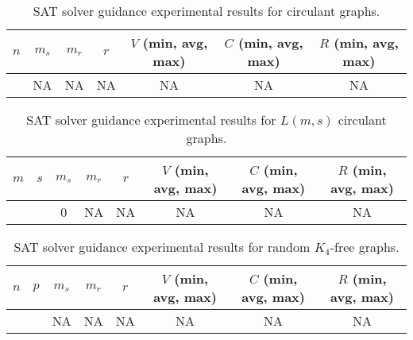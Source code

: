 \documentclass[paper=a4, fontsize=11pt]{scrartcl} %
\begin{document}
\begin{table*}[t]
	\caption{SAT solver guidance experimental results for circulant graphs.}
	\begin{tabular}{c | c | c | c | c | c | c}
		\hline
		$n$ & $m_s$ & $m_r$ & $r$ & $V$ (min, avg, max) & $C$ (min, avg, max) & $R$ (min, avg, max) \\ \hline
		~ & NA & NA & NA & NA & NA & NA \\
		\hline
	\end{tabular}
	\label{tab:guidanceExperiment-circulant}
\end{table*}

\begin{table*}[t]
	\caption{SAT solver guidance experimental results for $L(m,s)$ circulant graphs.}
	\begin{tabular}{c | c | c | c | c | c | c | c}
		\hline
		$m$ & $s$ & $m_s$ & $m_r$ & $r$ & $V$ (min, avg, max) & $C$ (min, avg, max) & $R$ (min, avg, max) \\ \hline
		~ & ~ & 0 & NA & NA & NA & NA & NA \\ 
		\hline
	\end{tabular}
	\label{tab:guidanceExperiment-lms}
\end{table*}

\begin{table*}[t]
	\caption{SAT solver guidance experimental results for random $K_4$-free graphs.}
	\begin{tabular}{c | c | c | c | c | c | c | c}
		\hline
		$n$ & $p$ & $m_s$ & $m_r$ & $r$ & $V$ (min, avg, max) & $C$ (min, avg, max) & $R$ (min, avg, max) \\ \hline
		~ & ~ & NA & NA & NA & NA & NA & NA \\
		\hline
	\end{tabular}
	\label{tab:guidanceExperiment-random}
\end{table*}


\end{document}
